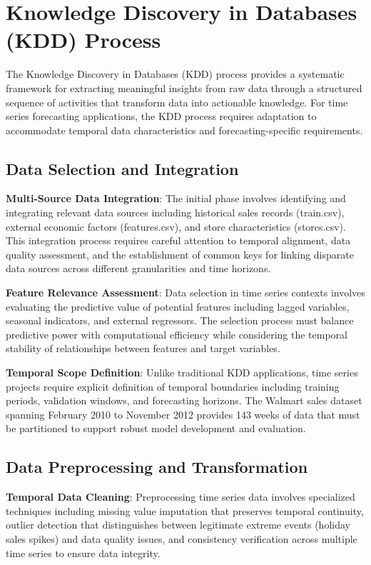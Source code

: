 \section{Knowledge Discovery in Databases (KDD) Process}

The Knowledge Discovery in Databases (KDD) process provides a systematic framework for extracting meaningful insights from raw data through a structured sequence of activities that transform data into actionable knowledge. For time series forecasting applications, the KDD process requires adaptation to accommodate temporal data characteristics and forecasting-specific requirements.

\subsection{Data Selection and Integration}

\textbf{Multi-Source Data Integration}: The initial phase involves identifying and integrating relevant data sources including historical sales records (train.csv), external economic factors (features.csv), and store characteristics (stores.csv). This integration process requires careful attention to temporal alignment, data quality assessment, and the establishment of common keys for linking disparate data sources across different granularities and time horizons.

\textbf{Feature Relevance Assessment}: Data selection in time series contexts involves evaluating the predictive value of potential features including lagged variables, seasonal indicators, and external regressors. The selection process must balance predictive power with computational efficiency while considering the temporal stability of relationships between features and target variables.

\textbf{Temporal Scope Definition}: Unlike traditional KDD applications, time series projects require explicit definition of temporal boundaries including training periods, validation windows, and forecasting horizons. The Walmart sales dataset spanning February 2010 to November 2012 provides 143 weeks of data that must be partitioned to support robust model development and evaluation.

\subsection{Data Preprocessing and Transformation}

\textbf{Temporal Data Cleaning}: Preprocessing time series data involves specialized techniques including missing value imputation that preserves temporal continuity, outlier detection that distinguishes between legitimate extreme events (holiday sales spikes) and data quality issues, and consistency verification across multiple time series to ensure data integrity.

